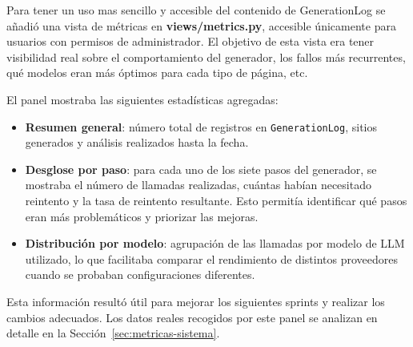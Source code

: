 Para tener un uso mas sencillo y accesible del contenido de GenerationLog se añadió una vista de métricas en \textbf{views/metrics.py}, accesible únicamente para usuarios con permisos de administrador. El objetivo de esta vista era tener visibilidad real sobre el comportamiento del generador, los fallos más recurrentes, qué modelos eran más óptimos para cada tipo de página, etc.

El panel mostraba las siguientes estadísticas agregadas:

\begin{itemize}
    \item \textbf{Resumen general}: número total de registros en \texttt{GenerationLog}, sitios generados y análisis realizados hasta la fecha.
    \item \textbf{Desglose por paso}: para cada uno de los siete pasos del generador, se mostraba el número de llamadas realizadas, cuántas habían necesitado reintento y la tasa de reintento resultante. Esto permitía identificar qué pasos eran más problemáticos y priorizar las mejoras.
    \item \textbf{Distribución por modelo}: agrupación de las llamadas por modelo de LLM utilizado, lo que facilitaba comparar el rendimiento de distintos proveedores cuando se probaban configuraciones diferentes.
\end{itemize}

Esta información resultó útil para mejorar los siguientes sprints y realizar los cambios adecuados. Los datos reales recogidos por este panel se analizan en detalle en la Sección~\ref{sec:metricas-sistema}.

